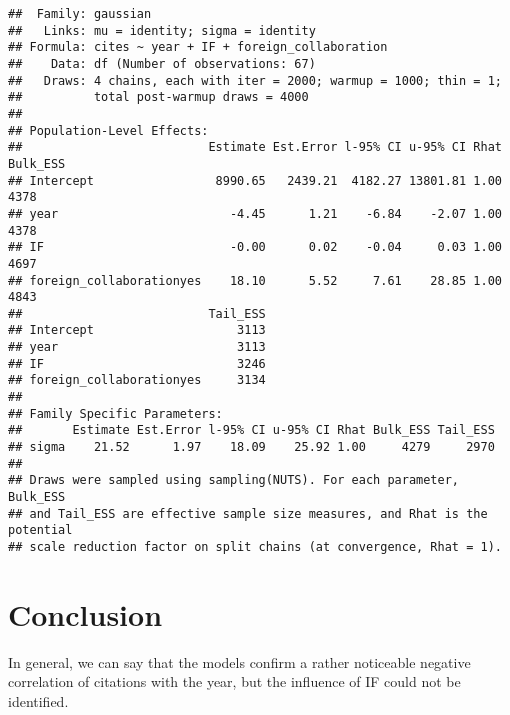 \documentclass[
]{article}
\begin{document}
\begin{verbatim}
##  Family: gaussian 
##   Links: mu = identity; sigma = identity 
## Formula: cites ~ year + IF + foreign_collaboration 
##    Data: df (Number of observations: 67) 
##   Draws: 4 chains, each with iter = 2000; warmup = 1000; thin = 1;
##          total post-warmup draws = 4000
## 
## Population-Level Effects: 
##                          Estimate Est.Error l-95% CI u-95% CI Rhat Bulk_ESS
## Intercept                 8990.65   2439.21  4182.27 13801.81 1.00     4378
## year                        -4.45      1.21    -6.84    -2.07 1.00     4378
## IF                          -0.00      0.02    -0.04     0.03 1.00     4697
## foreign_collaborationyes    18.10      5.52     7.61    28.85 1.00     4843
##                          Tail_ESS
## Intercept                    3113
## year                         3113
## IF                           3246
## foreign_collaborationyes     3134
## 
## Family Specific Parameters: 
##       Estimate Est.Error l-95% CI u-95% CI Rhat Bulk_ESS Tail_ESS
## sigma    21.52      1.97    18.09    25.92 1.00     4279     2970
## 
## Draws were sampled using sampling(NUTS). For each parameter, Bulk_ESS
## and Tail_ESS are effective sample size measures, and Rhat is the potential
## scale reduction factor on split chains (at convergence, Rhat = 1).
\end{verbatim}

\hypertarget{conclusion}{%
\section{Conclusion}\label{conclusion}}

In general, we can say that the models confirm a rather noticeable
negative correlation of citations with the year, but the influence of IF
could not be identified.
\end{document}
